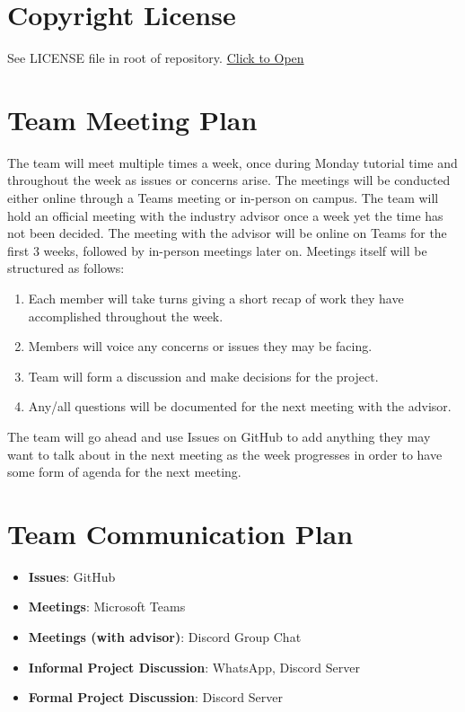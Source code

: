 \documentclass{article}
\begin{document}
\section{Copyright License}

See LICENSE file in root of repository.
\href{https://github.com/ssm-lab/capstone--source-code-optimizer/blob/main/LICENSE}{Click to Open}

\section{Team Meeting Plan}

\hspace{\parindent} The team will meet multiple times a week, once during Monday tutorial time and throughout the week as issues or concerns arise. The meetings will be conducted either online through a Teams meeting or in-person on campus. The team
will hold an official meeting with the industry advisor once a week yet the time has not been decided. The meeting with the advisor will be online on Teams for the first 3 weeks, followed by in-person meetings later on. Meetings itself will be structured as follows:
\begin{enumerate}
  \item Each member will take turns giving a short recap of work they have accomplished throughout the week.
  \item Members will voice any concerns or issues they may be facing.
  \item Team will form a discussion and make decisions for the project.
  \item Any/all questions will be documented for the next meeting with the advisor.
\end{enumerate}
The team will go ahead and use Issues on GitHub to add anything they may want to talk about in the next meeting as the week progresses in order to have some form of agenda for the next meeting.

\section{Team Communication Plan}

\begin{itemize}
    \item \textbf{Issues}: GitHub 
    \item \textbf{Meetings}: Microsoft Teams 
    \item \textbf{Meetings (with advisor)}: Discord Group Chat
    \item \textbf{Informal Project Discussion}: WhatsApp, Discord Server
    \item \textbf{Formal Project Discussion}: Discord Server
\end{itemize}
\end{document}

